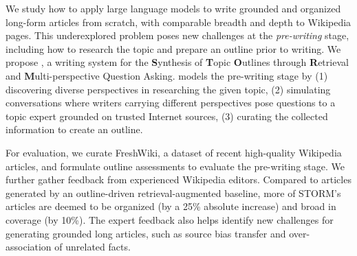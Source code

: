 

We study how to apply large language models to write grounded and organized long-form articles from scratch, with comparable breadth and depth to Wikipedia pages. This underexplored problem poses new challenges at the {\em pre-writing} stage, including how to research the topic and prepare an outline prior to writing.
We propose \textbf{\system}, a writing system for the \textbf{S}ynthesis of \textbf{T}opic \textbf{O}utlines through \textbf{R}etrieval and \textbf{M}ulti-perspective Question Asking.
\system models the pre-writing stage by %
(1) discovering diverse perspectives in researching the given topic, 
(2) simulating conversations where writers carrying different perspectives pose %
questions to a topic expert grounded on trusted Internet sources, (3) curating the collected information to create an outline. 

For evaluation, we curate FreshWiki, a dataset of recent high-quality Wikipedia articles, and formulate outline assessments to evaluate the pre-writing stage. 
We further gather feedback %
from experienced Wikipedia editors. Compared to articles generated by an outline-driven retrieval-augmented baseline, more of STORM's articles are deemed to be organized (by a 25\% absolute increase) and broad in coverage (by 10\%).
The expert feedback also helps identify new challenges for generating grounded long articles, such as source bias transfer and over-association of unrelated facts.










